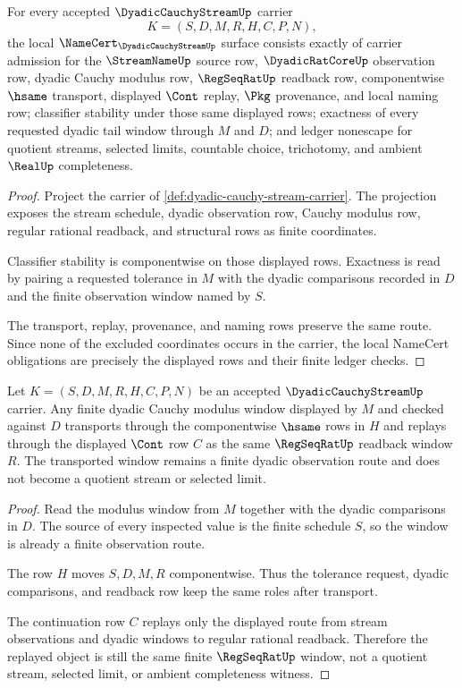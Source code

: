 \begin{theorem}
\label{thm:dyadic-cauchy-stream-namecert-obligations}
For every accepted $\DyadicCauchyStreamUp$ carrier
$$
K=(S,D,M,R,H,C,P,N),
$$
the local $\NameCert_{\DyadicCauchyStreamUp}$ surface consists exactly of carrier admission for the $\StreamNameUp$ source row, $\DyadicRatCoreUp$ observation row, dyadic Cauchy modulus row, $\RegSeqRatUp$ readback row, componentwise $\hsame$ transport, displayed $\Cont$ replay, $\Pkg$ provenance, and local naming row; classifier stability under those same displayed rows; exactness of every requested dyadic tail window through $M$ and $D$; and ledger nonescape for quotient streams, selected limits, countable choice, trichotomy, and ambient $\RealUp$ completeness.
\end{theorem}
\begin{proof}
Project the carrier of \autoref{def:dyadic-cauchy-stream-carrier}. The projection exposes the stream schedule, dyadic observation row, Cauchy modulus row, regular rational readback, and structural rows as finite coordinates.

Classifier stability is componentwise on those displayed rows. Exactness is read by pairing a requested tolerance in $M$ with the dyadic comparisons recorded in $D$ and the finite observation window named by $S$.

The transport, replay, provenance, and naming rows preserve the same route. Since none of the excluded coordinates occurs in the carrier, the local NameCert obligations are precisely the displayed rows and their finite ledger checks.
\end{proof}

\begin{theorem}
\label{thm:dyadic-cauchy-stream-regularity-stability}
Let $K=(S,D,M,R,H,C,P,N)$ be an accepted $\DyadicCauchyStreamUp$ carrier. Any finite dyadic Cauchy modulus window displayed by $M$ and checked against $D$ transports through the componentwise $\hsame$ rows in $H$ and replays through the displayed $\Cont$ row $C$ as the same $\RegSeqRatUp$ readback window $R$. The transported window remains a finite dyadic observation route and does not become a quotient stream or selected limit.
\end{theorem}
\begin{proof}
Read the modulus window from $M$ together with the dyadic comparisons in $D$. The source of every inspected value is the finite schedule $S$, so the window is already a finite observation route.

The row $H$ moves $S,D,M,R$ componentwise. Thus the tolerance request, dyadic comparisons, and readback row keep the same roles after transport.

The continuation row $C$ replays only the displayed route from stream observations and dyadic windows to regular rational readback. Therefore the replayed object is still the same finite $\RegSeqRatUp$ window, not a quotient stream, selected limit, or ambient completeness witness.
\end{proof}

